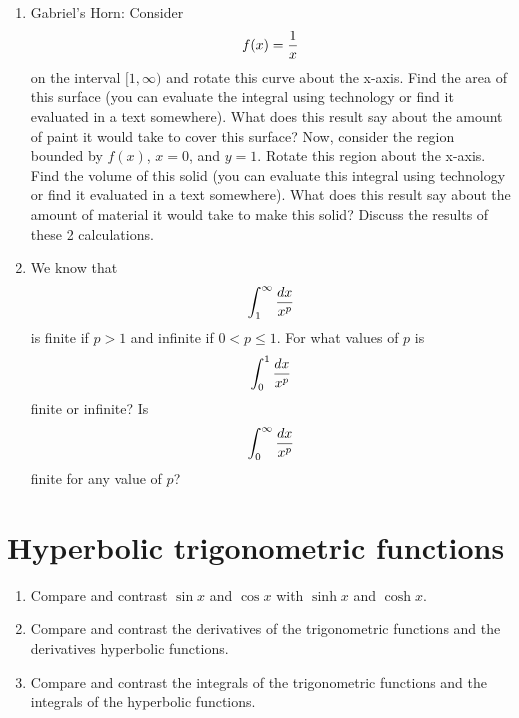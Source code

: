 \begin{enumerate}
\item  Gabriel's Horn:  Consider$$f(x) = {1 \over x}$$ on the interval $[1, \infty)$ and rotate this curve about the x-axis.  Find the area of this surface (you can evaluate the integral using technology or find it evaluated in a text somewhere).  What does this result say about the amount of paint it would take to cover this surface?
	Now, consider the region bounded by $f(x)$, $x = 0$, and $y = 1$.  Rotate this region about the x-axis.  Find the volume of this solid (you can evaluate this integral using technology or find it evaluated in a text somewhere).  What does this result say about the amount of material it would take to make this solid?
	Discuss the results of these 2 calculations.  

\item  We know that $$\int_1^\infty  {{{dx} \over {x^p }}} $$ is finite if $p > 1$ and infinite if $0 < p \le 1$.  For what values of $p$ is $$\int_0^1 {{{dx} \over {x^p }}} $$ finite or infinite? Is $$\int_0^\infty  {{{dx} \over {x^p }}} $$ finite for any value of $p$?

\end{enumerate}\section{Hyperbolic trigonometric functions}\begin{enumerate}

\item  Compare and contrast $\sin x$ and $\cos x$ with $\sinh x$ and $\cosh x$.

\item  Compare and contrast the derivatives of the trigonometric functions and the derivatives hyperbolic functions.

\item  Compare and contrast the integrals of the trigonometric functions and the integrals of the hyperbolic functions. 

\end{enumerate} 
